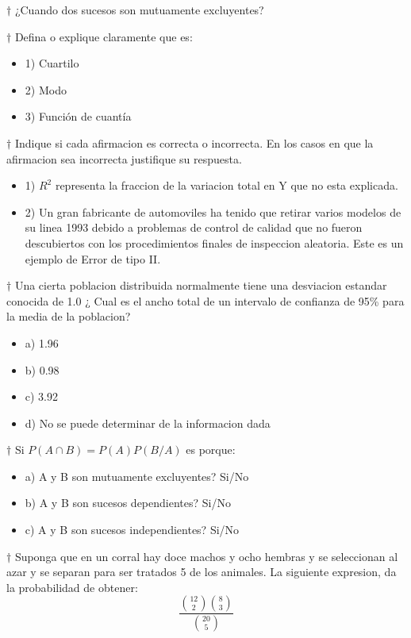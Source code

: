 \documentclass[10pt,a4paper]{article}
\begin{document}
$\dagger$ ¿Cuando dos sucesos son mutuamente excluyentes?

$\dagger$ Defina o explique claramente que es:
\begin{itemize}
	\item 1) Cuartilo
	\item 2) Modo
	\item 3) Función de cuantía
\end{itemize}

$\dagger$ Indique si cada afirmacion es correcta o incorrecta. En los casos en que la afirmacion sea incorrecta justifique su respuesta.
\begin{itemize}
	\item 1) $R^2$ representa la fraccion de la variacion total en Y que no esta explicada.
	\item 2) Un gran fabricante de automoviles ha tenido que retirar varios modelos de su linea 1993 debido a problemas de control de calidad que no fueron descubiertos con los procedimientos finales de inspeccion aleatoria. Este es un ejemplo de Error de tipo II.
\end{itemize}

$\dagger$ Una cierta poblacion distribuida normalmente tiene una desviacion estandar conocida de 1.0 ¿ Cual es el ancho total de un intervalo de confianza de 95\% para la media de la poblacion?
\begin{itemize}
	\item a) 1.96
	\item b) 0.98
	\item c) 3.92
	\item d) No se puede determinar de la informacion dada
\end{itemize}

$\dagger$ Si $P(A\cap B) = P(A)P(B/A)$ es porque:
\begin{itemize}
	\item a) A y B son mutuamente excluyentes? Si/No
	\item b) A y B son sucesos dependientes? Si/No
	\item c) A y B son sucesos independientes? Si/No
\end{itemize}

$\dagger$ Suponga que en un corral hay doce machos y ocho hembras y se seleccionan al azar y se separan para ser tratados 5 de los animales. La siguiente expresion, da la probabilidad de obtener:
\begin{equation}
	\frac{\genfrac(){0pt}{2}{12}{2}\genfrac(){0pt}{2}{8}{3}}{\genfrac(){0pt}{2}{20}{5}}
\end{equation}
\end{document}
